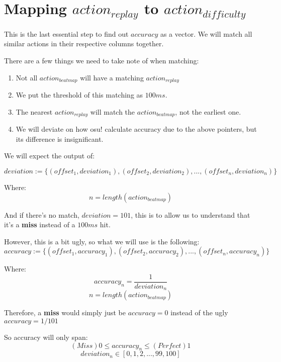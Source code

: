 
\section{Mapping $action_{replay}$ to $action_{difficulty}$}

This is the last essential step to find out $accuracy$ as a vector. We will match all similar actions in their respective columns together.

There are a few things we need to take note of when matching:
\begin{enumerate}
	\item Not all $action_{beatmap}$ will have a matching $action_{replay}$
	\item We put the threshold of this matching as $100ms$.
	\item The nearest $action_{replay}$ will match the $action_{beatmap}$, not the earliest one.
	\item We will deviate on how osu! calculate accuracy due to the above pointers, but its difference is insignificant.
\end{enumerate}

We will expect the output of:

$$ deviation := \lbrace(offset_1, deviation_1), (offset_2, deviation_2), ..., (offset_n, deviation_n)\rbrace $$

Where:
$$ n = length(action_{beatmap}) $$

And if there's no match, $deviation = 101$, this is to allow us to understand that it's a \textbf{miss} instead of a $100ms$ hit.

However, this is a bit ugly, so what we will use is the following:
$$ accuracy := \lbrace(offset_1, accuracy_1), (offset_2, accuracy_2), ..., (offset_n, accuracy_n)\rbrace $$

Where:
$$ accuracy_n = \frac{1}{deviation_n} $$
$$ n = length(action_{beatmap}) $$

Therefore, a \textbf{miss} would simply just be $accuracy = 0$ instead of the ugly $accuracy = 1/101$

So accuracy will only span:
$$ (Miss) 0 \leq accuracy_n \leq (Perfect) 1 $$
$$ deviation_n \in [0, 1, 2, ..., 99, 100] $$


